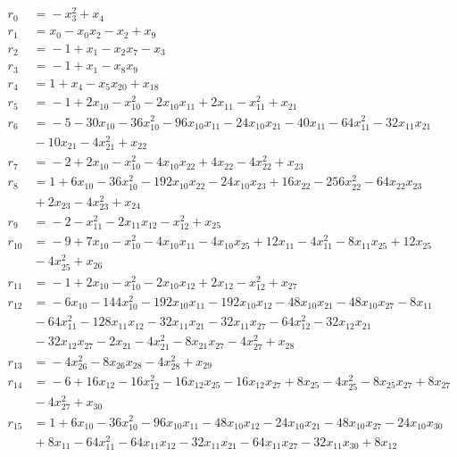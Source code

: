 \begingroup\small
\allowdisplaybreaks[4]
\begin{align*}
r_{0} &={}-x_{3}^{2} +x_{4} \\
r_{1} &={}x_{0} -x_{0}x_{2} -x_{2} +x_{9} \\
r_{2} &={}-1 +x_{1} -x_{2}x_{7} -x_{3} \\
r_{3} &={}-1 +x_{1} -x_{8}x_{9} \\
r_{4} &={}1 +x_{4} -x_{5}x_{20} +x_{18} \\
r_{5} &={}-1 +2x_{10} -x_{10}^{2} -2x_{10}x_{11} +2x_{11} -x_{11}^{2} +x_{21} \\
r_{6} &={}-5 -30x_{10} -36x_{10}^{2} -96x_{10}x_{11} -24x_{10}x_{21} -40x_{11} -64x_{11}^{2} -32x_{11}x_{21} \\
&{}-10x_{21} -4x_{21}^{2} +x_{22} \\
r_{7} &={}-2 +2x_{10} -x_{10}^{2} -4x_{10}x_{22} +4x_{22} -4x_{22}^{2} +x_{23} \\
r_{8} &={}1 +6x_{10} -36x_{10}^{2} -192x_{10}x_{22} -24x_{10}x_{23} +16x_{22} -256x_{22}^{2} -64x_{22}x_{23} \\
&{}+2x_{23} -4x_{23}^{2} +x_{24} \\
r_{9} &={}-2 -x_{11}^{2} -2x_{11}x_{12} -x_{12}^{2} +x_{25} \\
r_{10} &={}-9 +7x_{10} -x_{10}^{2} -4x_{10}x_{11} -4x_{10}x_{25} +12x_{11} -4x_{11}^{2} -8x_{11}x_{25} +12x_{25} \\
&{}-4x_{25}^{2} +x_{26} \\
r_{11} &={}-1 +2x_{10} -x_{10}^{2} -2x_{10}x_{12} +2x_{12} -x_{12}^{2} +x_{27} \\
r_{12} &={}-6x_{10} -144x_{10}^{2} -192x_{10}x_{11} -192x_{10}x_{12} -48x_{10}x_{21} -48x_{10}x_{27} -8x_{11} \\
&{}-64x_{11}^{2} -128x_{11}x_{12} -32x_{11}x_{21} -32x_{11}x_{27} -64x_{12}^{2} -32x_{12}x_{21} \\
&{}-32x_{12}x_{27} -2x_{21} -4x_{21}^{2} -8x_{21}x_{27} -4x_{27}^{2} +x_{28} \\
r_{13} &={}-4x_{26}^{2} -8x_{26}x_{28} -4x_{28}^{2} +x_{29} \\
r_{14} &={}-6 +16x_{12} -16x_{12}^{2} -16x_{12}x_{25} -16x_{12}x_{27} +8x_{25} -4x_{25}^{2} -8x_{25}x_{27} +8x_{27} \\
&{}-4x_{27}^{2} +x_{30} \\
r_{15} &={}1 +6x_{10} -36x_{10}^{2} -96x_{10}x_{11} -48x_{10}x_{12} -24x_{10}x_{21} -48x_{10}x_{27} -24x_{10}x_{30} \\
&{}+8x_{11} -64x_{11}^{2} -64x_{11}x_{12} -32x_{11}x_{21} -64x_{11}x_{27} -32x_{11}x_{30} +8x_{12} \\

\end{align*}
